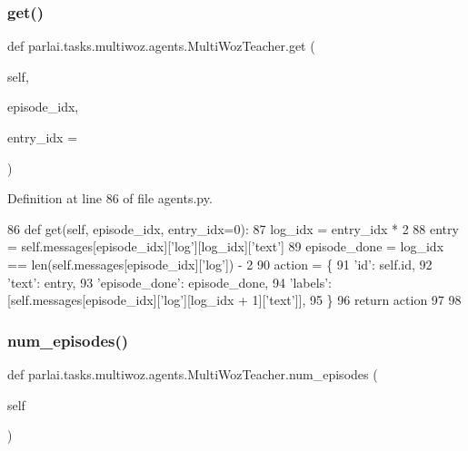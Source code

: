 \subsubsection{\texorpdfstring{get()}{get()}}
{\footnotesize\ttfamily def parlai.\+tasks.\+multiwoz.\+agents.\+Multi\+Woz\+Teacher.\+get (\begin{DoxyParamCaption}\item[{}]{self,  }\item[{}]{episode\+\_\+idx,  }\item[{}]{entry\+\_\+idx = {} }\end{DoxyParamCaption})}



Definition at line 86 of file agents.\+py.


\begin{DoxyCode}
86     \textcolor{keyword}{def }get(self, episode\_idx, entry\_idx=0):
87         log\_idx = entry\_idx * 2
88         entry = self.messages[episode\_idx][\textcolor{stringliteral}{'log'}][log\_idx][\textcolor{stringliteral}{'text'}]
89         episode\_done = log\_idx == len(self.messages[episode\_idx][\textcolor{stringliteral}{'log'}]) - 2
90         action = \{
91             \textcolor{stringliteral}{'id'}: self.id,
92             \textcolor{stringliteral}{'text'}: entry,
93             \textcolor{stringliteral}{'episode\_done'}: episode\_done,
94             \textcolor{stringliteral}{'labels'}: [self.messages[episode\_idx][\textcolor{stringliteral}{'log'}][log\_idx + 1][\textcolor{stringliteral}{'text'}]],
95         \}
96         \textcolor{keywordflow}{return} action
97 
98 
\end{DoxyCode}
\mbox{\label{classparlai_1_1tasks_1_1multiwoz_1_1agents_1_1MultiWozTeacher_a0b28fec07160f7a36bc820fb74baf5b2}} 
\subsubsection{\texorpdfstring{num\+\_\+episodes()}{num\_episodes()}}
{\footnotesize\ttfamily def parlai.\+tasks.\+multiwoz.\+agents.\+Multi\+Woz\+Teacher.\+num\+\_\+episodes (\begin{DoxyParamCaption}\item[{}]{self }\end{DoxyParamCaption})}



